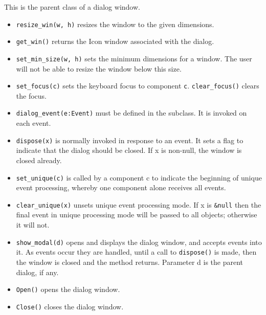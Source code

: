 \newpage
\medskip{}

This is the parent class of a dialog window.

\begin{itemize}
\item\noindent\texttt{resize\_win(w, h)} resizes the window to the given dimensions.

\item\noindent\texttt{get\_win()} returns the Icon window associated with the dialog.

\item\noindent\texttt{set\_min\_size(w, h)} sets the minimum dimensions for a window. The user
will not be able to resize the window below this size.

\item\noindent\texttt{set\_focus(c)} sets the keyboard focus to component \texttt{c}.
\texttt{clear\_focus()} clears the focus.

\item\noindent\texttt{dialog\_event(e:Event)} must be defined in the subclass. It is
invoked on each event.

\item\noindent\texttt{dispose(x)} is normally invoked in response to an event.
It sets a flag to indicate that the dialog should be closed. If x is non-null,
the window is closed already.

\item\noindent\texttt{set\_unique(c)} is called by a component c to indicate the beginning of
unique event processing, whereby one component alone receives all events.

\item\noindent\texttt{clear\_unique(x)} unsets unique event processing mode. If x is \texttt{\&null}
then the final event in unique processing mode will be passed to all
objects; otherwise it will not.

\item\noindent\texttt{show\_modal(d)} opens and displays the dialog window, and accepts events
into it. As events occur they are handled, until a call to \texttt{dispose()}
is made, then the window is closed and the method returns. Parameter d
is the parent dialog, if any.

\item\noindent\texttt{Open()} opens the dialog window.

\item\noindent\texttt{Close()} closes the dialog window.


\end{itemize}
